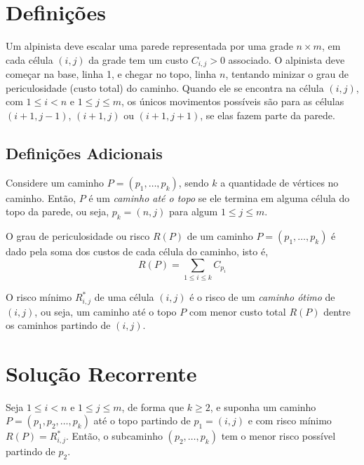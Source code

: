 \section{Definições}

Um alpinista deve escalar uma parede representada por uma grade $n \times m$, em cada célula $(i, j)$ da grade tem um custo $C_{i, j} > 0$ associado. O alpinista deve começar na base, linha 1, e chegar no topo, linha $n$, tentando minizar o grau de periculosidade (custo total) do caminho. Quando ele se encontra na célula $(i, j)$, com $1 \leq i < n$ e $1 \leq j \leq m$, os únicos movimentos possíveis são para as células $(i+1, j-1)$, $(i+1, j)$ ou $(i+1, j+1)$, se elas fazem parte da parede.

\subsection{Definições Adicionais}

\begin{definition}
    Considere um caminho $P = \left(p_1, \ldots, p_k\right)$, sendo $k$ a quantidade de vértices no caminho. Então, $P$ é um \textit{caminho até o topo} se ele termina em alguma célula do topo da parede, ou seja, $p_k = (n, j)$ para algum $1 \leq j \leq m$.
\end{definition}

\begin{definition}[Risco]
    O grau de periculosidade ou risco $R(P)$ de um caminho $P = \left(p_1, \ldots, p_k\right)$ é dado pela soma dos custos de cada célula do caminho, isto é,
    \[
        R(P) = \sum_{1 \leq i \leq k} C_{p_i}
    \]
\end{definition}

\begin{definition}
    O risco mínimo $R^*_{i, j}$ de uma célula $(i, j)$ é o risco de um \textit{caminho ótimo} de $(i, j)$, ou seja, um caminho até o topo $P$ com menor custo total $R(P)$ dentre os caminhos partindo de $(i, j)$.
\end{definition}

\section{Solução Recorrente}

\begin{theorem}
    Seja $1 \leq i < n$ e $1 \leq j \leq m$, de forma que $k \geq 2$, e suponha um caminho $P = \left(p_1, p_2, \ldots, p_k\right)$ até o topo partindo de $p_1 = (i, j)$ e com risco mínimo $R(P) = R^*_{i, j}$. Então, o subcaminho $\left(p_2, \ldots, p_k\right)$ tem o menor risco possível partindo de $p_2$.
\end{theorem}

